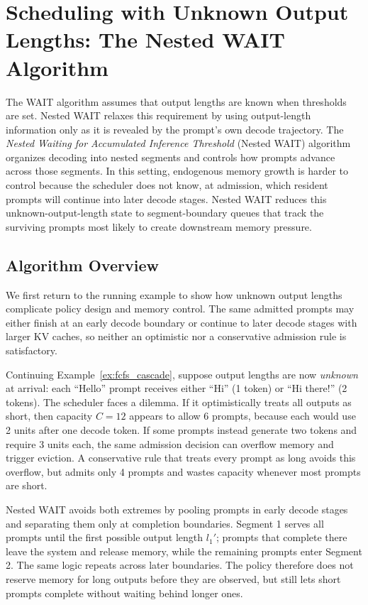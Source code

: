 \section{Scheduling with Unknown Output Lengths: The Nested WAIT Algorithm}
\label{sec:nested_wait}

The WAIT algorithm assumes that output lengths are known when thresholds are set. Nested WAIT relaxes this requirement by using output-length information only as it is revealed by the prompt's own decode trajectory. The \textit{Nested Waiting for Accumulated Inference Threshold} (Nested WAIT) algorithm organizes decoding into nested segments and controls how prompts advance across those segments. In this setting, endogenous memory growth is harder to control because the scheduler does not know, at admission, which resident prompts will continue into later decode stages. Nested WAIT reduces this unknown-output-length state to segment-boundary queues that track the surviving prompts most likely to create downstream memory pressure.

\subsection{Algorithm Overview}

We first return to the running example to show how unknown output lengths complicate policy design and memory control. The same admitted prompts may either finish at an early decode boundary or continue to later decode stages with larger KV caches, so neither an optimistic nor a conservative admission rule is satisfactory.

\begin{example}
\label{ex:unknown_output}
Continuing Example~\ref{ex:fcfs_cascade}, suppose output lengths are now \emph{unknown} at arrival: each ``Hello'' prompt receives either ``Hi'' (1 token) or ``Hi there!'' (2 tokens). The scheduler faces a dilemma. If it optimistically treats all outputs as short, then capacity \(C=12\) appears to allow 6 prompts, because each would use 2 units after one decode token. If some prompts instead generate two tokens and require 3 units each, the same admission decision can overflow memory and trigger eviction. A conservative rule that treats every prompt as long avoids this overflow, but admits only 4 prompts and wastes capacity whenever most prompts are short.
\end{example}

Nested WAIT avoids both extremes by pooling prompts in early decode stages and separating them only at completion boundaries. Segment 1 serves all prompts until the first possible output length \(l_1'\); prompts that complete there leave the system and release memory, while the remaining prompts enter Segment 2. The same logic repeats across later boundaries. The policy therefore does not reserve memory for long outputs before they are observed, but still lets short prompts complete without waiting behind longer ones.

